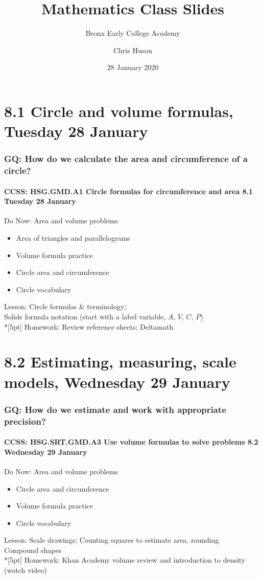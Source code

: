 \documentclass{beamer}
\title{Mathematics Class Slides}
\subtitle{Bronx Early College Academy}
\author{Chris Huson}
\date{28 January 2020}
\begin{document}
\frame{\titlepage}
\section[Outline]{}
\frame{\tableofcontents}

\section{8.1 Circle and volume formulas, Tuesday 28 January} 
\frame
{
  \frametitle{GQ: How do we calculate the area and circumference of a circle?}
  \framesubtitle{CCSS: HSG.GMD.A1 Circle formulas for circumference and area \hfill \alert{8.1 Tuesday 28 January}}

  \begin{block}{Do Now: Area and volume problems}
  \begin{itemize}
    \item Area of triangles and parallelograms
    \item Volume formula practice
    \item Circle area and circumference
    \item Circle vocabulary
  \end{itemize}
  \end{block}
  Lesson: Circle formulas \& terminology; \\
  Solids formula notation (start with a label variable, $A$, $V$, $C$, $P$)\\*[5pt]
  Homework: Review reference sheets; Deltamath
}

\section{8.2 Estimating, measuring, scale models, Wednesday 29 January}
\frame
{
  \frametitle{GQ: How do we estimate and work with appropriate precision?}
  \framesubtitle{CCSS: HSG.SRT.GMD.A3 Use volume formulas to solve problems \hfill \alert{8.2 Wednesday 29 January}}

  \begin{block}{Do Now: Area and volume problems}
  \begin{itemize}
    \item Circle area and circumference
    \item Volume formula practice
    \item Circle vocabulary
  \end{itemize}
  \end{block}
  Lesson: Scale drawings; Counting squares to estimate area, rounding\\
  Compound shapes\\*[5pt]
  Homework: Khan Academy volume review and introduction to density (watch video)
}
\end{document}
